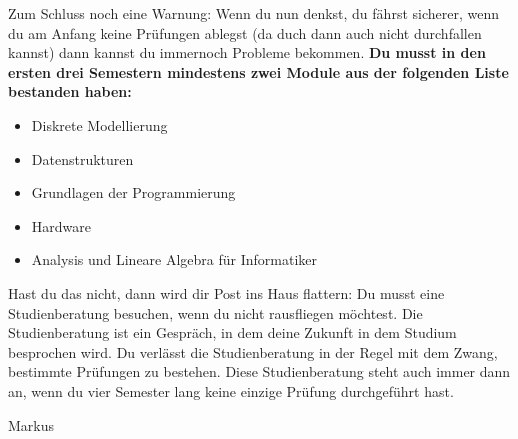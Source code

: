 Zum Schluss noch eine Warnung:
Wenn du nun denkst, du fährst sicherer, wenn du am Anfang keine Prüfungen ablegst (da duch dann auch nicht durchfallen kannst) dann kannst du immernoch Probleme bekommen.
\textbf{Du musst in den ersten drei Semestern mindestens zwei Module aus der folgenden Liste bestanden haben:}
\begin{itemize}
	\item Diskrete Modellierung
	\item Datenstrukturen
	\item Grundlagen der Programmierung
	\item Hardware
	\item Analysis und Lineare Algebra für Informatiker
\end{itemize}
Hast du das nicht, dann wird dir Post ins Haus flattern: 
Du musst eine Studienberatung besuchen, wenn du nicht rausfliegen möchtest.
Die Studienberatung ist ein Gespräch, in dem deine Zukunft in dem Studium besprochen wird. 
Du verlässt die Studienberatung in der Regel mit dem Zwang, bestimmte Prüfungen zu bestehen.
Diese Studienberatung steht auch immer dann an, wenn du vier Semester lang keine einzige Prüfung durchgeführt hast.

\begin{flushright}
	Markus
\end{flushright}